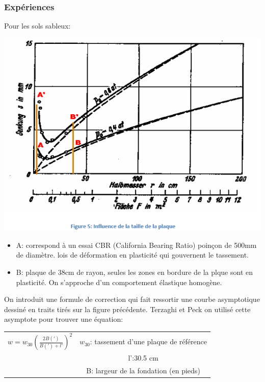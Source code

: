 \subsubsection{Expériences}

Pour les sols sableux:

\begin{center}
\includegraphics [scale=0.5]{pictures/5.PNG}
\end{center}

\begin{itemize}
    \item A: correspond à un essai CBR (California Bearing Ratio) poinçon de 500mm de diamètre. lois de déformation en plasticité qui gouvernent le tassement.
    \item B: plaque de 38cm de rayon, seules les zones en bordure de la plque sont en plasticité. On s'approche d'un comportement élastique homogène.
\end{itemize}

\medskip

On introduit une formule de correction qui fait ressortir une courbe asymptotique dessiné en traits tirés sur la figure précédente. Terzaghi et Peck on utilisé cette asymptote pour trouver une équation:

\begin{center}
\begin{tabular}{c|c}
$w = w_{30}(\frac{2B(')}{B(')+l'})^2$
        & $w_{30}$: tassement d'une plaque de référence \\
        & l':30.5 cm \\
        & B: largeur de la fondation (en pieds)
\end{tabular}
\end{center}

